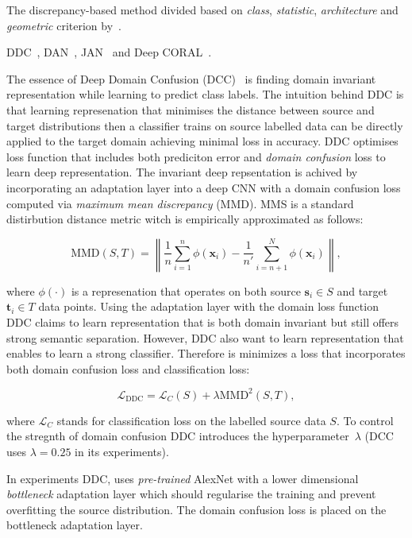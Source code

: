The discrepancy-based method divided based on
\textit{class}, \textit{statistic}, \textit{architecture} and \textit{geometric}
criterion by~\cite{wang2018}.

DDC~\cite{tzeng2014}, DAN~\cite{long2015}, JAN~\cite{long2017}
and Deep CORAL~\cite{sun2016}.

The essence of Deep Domain Confusion (DCC)~\cite{tzeng2014} is finding domain invariant representation
while learning to predict class labels.
The intuition behind DDC is that learning represenation
that minimises the distance between source and target distributions
then a classifier trains on source labelled data
can be directly applied to the target domain achieving minimal loss in accuracy.
DDC optimises loss function that includes both prediciton error and \textit{domain confusion} loss to learn deep representation.
The invariant deep repsentation is achived by incorporating an adaptation layer
into a deep CNN with a domain confusion loss computed via \textit{maximum mean discrepancy} (MMD).
MMS is a standard distirbution distance metric
witch is empirically approximated as follows:

\begin{equation}
	\mathrm{MMD}(S, T) = \left\|
	\frac{1}{n} \sum_{i = 1}^{n} \phi(\mathbf{x}_i) -
	\frac{1}{n'} \sum_{i = n + 1}^{N} \phi(\mathbf{x}_i)
	\right\|,
	\label{maximam_mean_discrepancy}
\end{equation}

where \(\phi(\cdot)\) is a represenation
that operates on both source \(\mathbf{s}_i \in S\) and target \(\mathbf{t}_i \in T\) data points.
Using the adaptation layer with the domain loss function DDC claims
to learn representation that is both domain invariant
but still offers strong semantic separation.
However, DDC also want to learn representation
that enables to learn a strong classifier.
Therefore is minimizes a loss that incorporates both domain confusion loss and classification loss:

\begin{equation}
	\mathcal{L}_{\mathrm{DDC}} = \mathcal{L}_C(S)
	+ \lambda \mathrm{MMD}^2(S, T),
	\label{ddc_loss}
\end{equation}

where \(\mathcal{L}_C\) stands for classification loss on the labelled source data \(S\).
To control the stregnth of domain confusion DDC introduces the hyperparameter~\(\lambda\)
(DCC uses \(\lambda = 0.25\) in its experiments).

In experiments DDC, uses \textit{pre-trained} AlexNet with a lower dimensional \textit{bottleneck} adaptation layer
which should regularise the training
and prevent overfitting the source distribution.
The domain confusion loss is placed on the bottleneck adaptation layer.

